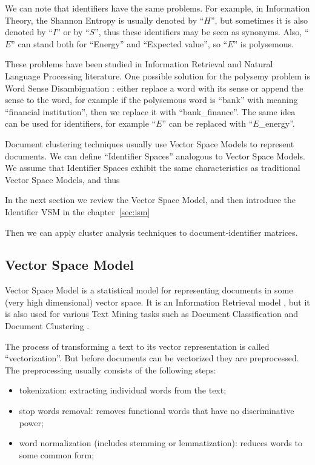We can note that identifiers have the same problems. For example,
in Information Theory, the Shannon Entropy is usually denoted by
``$H$'', but sometimes it is also denoted by ``$I$'' or by ``$S$'',
thus these identifiers may be seen as synonyms.
Also, ``$E$'' can stand both for ``Energy'' and ``Expected value'',
so ``$E$'' is polysemous.

These problems have been studied in Information Retrieval and
Natural Language Processing literature.
One possible solution for the polysemy problem is Word Sense Disambiguation
\cite{jurafsky2000speech}: either replace a word with its sense
\cite{stokoe2003word} or append the sense to the word, for example
if the polysemous word is ``bank'' with meaning ``financial institution'',
then we replace it with ``bank\_finance''. The same idea can be used
for identifiers, for example ``$E$'' can be replaced with ``$E$\_energy''.

Document clustering techniques usually use Vector Space Models
\cite{oikonomakou2005review} \cite{aggarwal2012survey} to represent documents.
We can define ``Identifier Spaces'' analogous to Vector Space Models.
We assume that Identifier Spaces exhibit the same characteristics as
traditional Vector Space Models, and thus

In the next section we review the Vector Space Model,
and then introduce the Identifier VSM in the chapter~\ref{sec:ism}

Then we can apply cluster analysis techniques to document-identifier matrices.


\subsection{Vector Space Model} \label{sec:vsm}

Vector Space Model is a statistical model for representing documents
in some (very high dimensional) vector space. It is an Information Retrieval
model \cite{manning2008introduction}, but it is also used for various
Text Mining tasks such as Document Classification \cite{sebastiani2002machine}
and Document Clustering \cite{oikonomakou2005review} \cite{aggarwal2012survey}.

The process of transforming a text to its vector representation is
called ``vectorization''. But before documents can be
vectorized they are preprocessed. The preprocessing usually consists of the
following steps:

\begin{itemize}
\itemsep1pt\parskip0pt
  \item tokenization: extracting individual words from the text;
  \item stop words removal: removes functional words that have no discriminative power;
  \item word normalization (includes stemming or lemmatization): reduces words to some common form;
\end{itemize}

